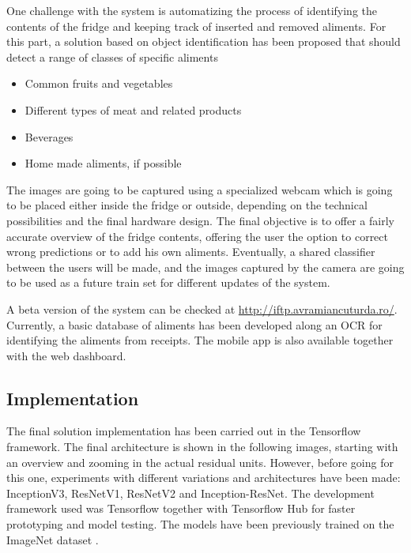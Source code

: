 \documentclass[a4paper,11pt]{article}
\begin{document}
	One challenge with the system is automatizing the process of identifying the contents of the fridge and keeping track of inserted and removed aliments. For this part, a solution based on object identification has been proposed that should detect a range of classes of specific aliments
	\begin{itemize}
		\item Common fruits and vegetables
		\item Different types of meat and related products
		\item Beverages
		\item Home made aliments, if possible
	\end{itemize}
	 The images are going to be captured using a specialized webcam which is going to be placed either inside the fridge or outside, depending on the technical possibilities and the final hardware design. The final objective is to offer a fairly accurate overview of the fridge contents, offering the user the option to correct wrong predictions or to add his own aliments. Eventually, a shared classifier between the users will be made, and the images captured by the camera are going to be used as a future train set for different updates of the system.
	 
	 A beta version of the system can be checked at \url{http://iftp.avramiancuturda.ro/}. Currently, a basic database of aliments has been developed along an OCR for identifying the aliments from receipts. The mobile app is also available together with the web dashboard.
  
  
  \subsection{Implementation}
  
	  The final solution implementation has been carried out in the Tensorflow framework. The final architecture is shown in the following images, starting with an overview and zooming in the actual residual units. However, before going for this one, experiments with different variations and architectures have been made: InceptionV3, ResNetV1, ResNetV2
	  and Inception-ResNet. The development framework
	  used was Tensorflow together with Tensorflow
	  Hub \cite{tensorflowHub} for faster prototyping and model testing. The
	  models have been previously trained on the ImageNet
	  dataset \cite{imagenet}. 
	\newline
\end{document}
